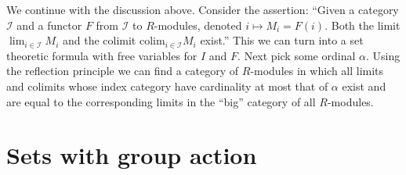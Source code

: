 \noindent
We continue with the discussion above.
Consider the assertion: ``Given a category $\mathcal{I}$
and a functor $F$ from $\mathcal{I}$ to $R$-modules,
denoted $i \mapsto M_i = F(i)$. Both the limit $\lim_{i\in \mathcal{I}} M_i$
and the colimit $\text{colim}_{i \in \mathcal{I}} M_i$ exist.'' 
This we can turn into a set theoretic formula with free
variables for $I$ and $F$. Next pick some ordinal $\alpha$.
Using the reflection principle
we can find a category of $R$-modules
in which all limits and colimits whose index category 
have cardinality at most that of $\alpha$ exist and
are equal to the corresponding limits in the ``big''
category of all $R$-modules.

\section{Sets with group action}
\label{section-sets-with-group-action}

